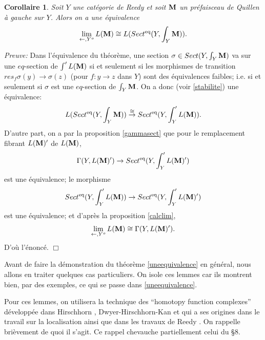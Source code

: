 \documentclass[12pt]{article}
\newcommand{\eop}{\hfill $\Box$\vspace{.1in}}
\newtheorem{corollaire}[lemma]{Corollaire}
\newcommand{\mm}{{\bf M}}
\begin{document}
\begin{corollaire}
\label{pqcalclim}
Soit $Y$ une cat\'egorie de Reedy et soit $\mm$ un pr\'efaisceau de Quillen \`a
gauche sur $Y$. Alors on a une \'equivalence
$$
\lim _{\leftarrow , Y^o}L(\mm )\cong L(Sect ^{\rm eq}(Y,\int _Y\mm )).
$$
\end{corollaire}
{\em Preuve:}
Dans l'\'equivalence du th\'eor\`eme, une section $\sigma \in Sect (Y,\int _Y\mm
)$ va sur une $eq$-section de $\int 'L(\mm )$ si et seulement si les morphismes
de transition $res_f\sigma (y)\rightarrow \sigma (z)$ (pour $f:y\rightarrow z$
dans $Y$) sont des \'equivalences faibles; i.e. si et seulement si $\sigma$ est
une $eq$-section de $\int _Y\mm$. On a donc (voir \ref{stabilite}) une
\'equivalence:
$$
L(Sect ^{\rm eq}(Y,\int _Y\mm ))
\stackrel{\cong}{\rightarrow} Sect ^{\rm eq}(Y,\int '_YL(\mm )).
$$
D'autre part, on a par la proposition \ref{gammasect} que pour le remplacement
fibrant $L(\mm )'$ de $L(\mm )$,
$$
\Gamma (Y, L(\mm )')\rightarrow
Sect ^{\rm eq}(Y,\int '_YL(\mm )')
$$
est une \'equivalence; le morphisme
$$
Sect ^{\rm eq}(Y,\int '_YL(\mm ))\rightarrow Sect ^{\rm eq}(Y,\int '_YL(\mm )')
$$
est une \'equivalence; et d'apr\`es la proposition \ref{calclim},
$$
\lim _{\leftarrow , Y^o}L(\mm ) \cong \Gamma (Y, L(\mm )').
$$
D'o\`u l'\'enonc\'e.
\eop

Avant de faire la d\'emonstration du th\'eor\`eme \ref{uneequivalence}
en g\'en\'eral, nous allons en traiter quelques cas particuliers. On isole
ces lemmes car ils montrent bien, par des
exemples, ce qui se passe dans \ref{uneequivalence}.

Pour ces lemmes, on utilisera la technique des ``homotopy function complexes''
d\'e\-ve\-lop\-p\'ee dans Hirschhorn \cite{Hirschhorn}, Dwyer-Hirschhorn-Kan
\cite{DHK} et qui a ses origines dans le travail sur la localisation
\cite{DwyerKan3} ainsi que dans les travaux de Reedy \cite{Reedy}.
On rappelle bri\`evement de
quoi il s'agit.
Ce rappel chevauche partiellement celui du \S 8.
\end{document}
